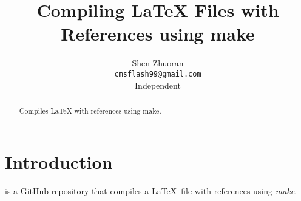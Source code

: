 \documentclass{article}
\title{Compiling LaTeX Files with References using make}
\author{
  Shen Zhuoran \\
  \texttt{cmsflash99@gmail.com} \\
  Independent \\
}
\begin{document}
\maketitle

\begin{abstract}
Compiles LaTeX with references using make.
\end{abstract}

\section{Introduction}

\cite{self} is a GitHub repository that compiles a \LaTeX \ file with references using \textit{make}.

 


\small
\end{document}
